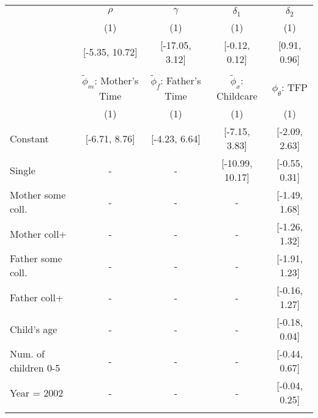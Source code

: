 \begin{tabular}{lcccc}\\\toprule
 & \multicolumn{1}{c}{$\rho$} & \multicolumn{1}{c}{$\gamma $} & \multicolumn{1}{c}{$\delta_{1}$} & \multicolumn{1}{c}{$\delta_{2}$} \\
&(1)&(1)&(1)&(1)\\\cmidrule(r){2-2}\cmidrule(r){3-3}\cmidrule(r){4-4}\cmidrule(r){5-5}
&[-5.35, 10.72]&[-17.05, 3.12]&[-0.12, 0.12]&[0.91, 0.96]\\
&&&&\\
 & \multicolumn{1}{c}{$\tilde{\phi}_{m}$: Mother's Time} & \multicolumn{1}{c}{$\tilde{\phi}_{f}$: Father's Time} & \multicolumn{1}{c}{$\tilde{\phi}_{x}$: Childcare} & \multicolumn{1}{c}{$\phi_{\theta}$: TFP} \\
&(1)&(1)&(1)&(1)\\\cmidrule(r){2-2}\cmidrule(r){3-3}\cmidrule(r){4-4}\cmidrule(r){5-5}
Constant&[-6.71, 8.76]&[-4.23, 6.64]&[-7.15, 3.83]&[-2.09, 2.63]\\
Single&-&-&[-10.99, 10.17]&[-0.55, 0.31]\\
Mother some coll.&-&-&-&[-1.49, 1.68]\\
Mother coll+&-&-&-&[-1.26, 1.32]\\
Father some coll.&-&-&-&[-1.91, 1.23]\\
Father coll+&-&-&-&[-0.16, 1.27]\\
Child's age&-&-&-&[-0.18, 0.04]\\
Num. of children 0-5&-&-&-&[-0.44, 0.67]\\
Year = 2002&-&-&-&[-0.04, 0.25]\\
\\
\bottomrule\end{tabular}